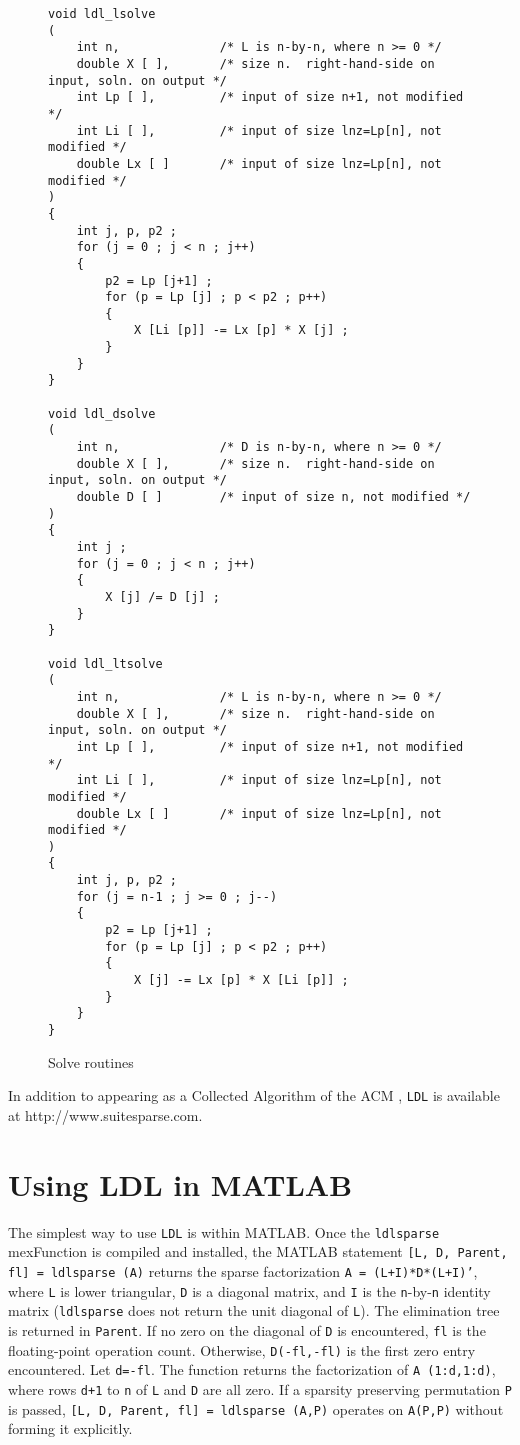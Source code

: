 \documentclass[12pt]{article}
\begin{document}
\begin{figure}
\caption{Solve routines}
\label{ldlsolve}
{\scriptsize
\begin{verbatim}
void ldl_lsolve
(
    int n,              /* L is n-by-n, where n >= 0 */
    double X [ ],       /* size n.  right-hand-side on input, soln. on output */
    int Lp [ ],         /* input of size n+1, not modified */
    int Li [ ],         /* input of size lnz=Lp[n], not modified */
    double Lx [ ]       /* input of size lnz=Lp[n], not modified */
)
{
    int j, p, p2 ;
    for (j = 0 ; j < n ; j++)
    {
        p2 = Lp [j+1] ;
        for (p = Lp [j] ; p < p2 ; p++)
        {
            X [Li [p]] -= Lx [p] * X [j] ;
        }
    }
}

void ldl_dsolve
(
    int n,              /* D is n-by-n, where n >= 0 */
    double X [ ],       /* size n.  right-hand-side on input, soln. on output */
    double D [ ]        /* input of size n, not modified */
)
{
    int j ;
    for (j = 0 ; j < n ; j++)
    {
        X [j] /= D [j] ;
    }
}

void ldl_ltsolve
(
    int n,              /* L is n-by-n, where n >= 0 */
    double X [ ],       /* size n.  right-hand-side on input, soln. on output */
    int Lp [ ],         /* input of size n+1, not modified */
    int Li [ ],         /* input of size lnz=Lp[n], not modified */
    double Lx [ ]       /* input of size lnz=Lp[n], not modified */
)
{
    int j, p, p2 ;
    for (j = n-1 ; j >= 0 ; j--)
    {
        p2 = Lp [j+1] ;
        for (p = Lp [j] ; p < p2 ; p++)
        {
            X [j] -= Lx [p] * X [Li [p]] ;
        }
    }
}
\end{verbatim}
}
\end{figure}

In addition to appearing as a Collected Algorithm of the ACM \cite{Davis05},
{\tt LDL} is available at http://www.suitesparse.com.

\section{Using LDL in MATLAB}
\label{MATLAB}

The simplest way to use {\tt LDL} is within MATLAB.  Once the {\tt ldlsparse}
mexFunction is compiled and installed, the MATLAB statement
{\tt [L, D, Parent, fl] = ldlsparse (A)} returns the sparse factorization
{\tt A = (L+I)*D*(L+I)'}, where {\tt L} is lower triangular, {\tt D} is a
diagonal matrix, and {\tt I} is the {\tt n}-by-{\tt n}
identity matrix ({\tt ldlsparse} does not return the unit diagonal of {\tt L}).
The elimination tree is returned in {\tt Parent}.
If no zero on the diagonal of {\tt D} is encountered, {\tt fl} is the
floating-point operation count.  Otherwise, {\tt D(-fl,-fl)} is the first
zero entry encountered.  Let {\tt d=-fl}.  The function returns the
factorization of {\tt A (1:d,1:d)}, where rows {\tt d+1} to {\tt n} of {\tt L}
and {\tt D} are all zero.  If a sparsity preserving permutation {\tt P} is
passed, {\tt [L, D, Parent, fl] = ldlsparse (A,P)}
operates on {\tt A(P,P)} without
forming it explicitly.
\end{document}
